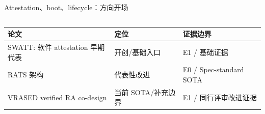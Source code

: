 \begin{frame}[t,shrink=6]{Attestation、boot、lifecycle：方向开场}
\begin{columns}[T,totalwidth=\textwidth]
\begin{column}{0.49\textwidth}
{\begin{minipage}[t]{0.97\linewidth}
\begin{minipage}{0.92\linewidth}
{\begin{tabularx}{\linewidth}{@{}YYY@{}}
\toprule
\textbf{论文} & \textbf{定位} & \textbf{证据边界} \\
\midrule
SWATT: 软件 attestation 早期代表 & 开创/基础入口 & E1 / 基础证据 \\
RATS 架构 & 代表性改进 & E0 / Spec-standard SOTA \\
VRASED verified RA co-design & 当前 SOTA/补充边界 & E1 / 同行评审改进证据 \\
\bottomrule
\end{tabularx}
}
    \end{minipage}
    \vspace{1mm}
  \end{minipage}}
  \end{column}
\end{columns}
\end{frame}


